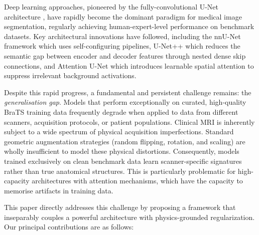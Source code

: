 \documentclass[conference]{IEEEtran}
\begin{document}
Deep learning approaches, pioneered by the fully-convolutional U-Net architecture \cite{ronneberger2015u}, have rapidly become the dominant paradigm for medical image segmentation, regularly achieving human-expert-level performance on benchmark datasets. Key architectural innovations have followed, including the nnU-Net framework \cite{isensee2021nnu} which uses self-configuring pipelines, U-Net++ \cite{zhou2018unet++} which reduces the semantic gap between encoder and decoder features through nested dense skip connections, and Attention U-Net \cite{oktay2018attention} which introduces learnable spatial attention to suppress irrelevant background activations.

Despite this rapid progress, a fundamental and persistent challenge remains: the \textit{generalisation gap}. Models that perform exceptionally on curated, high-quality BraTS training data frequently degrade when applied to data from different scanners, acquisition protocols, or patient populations. Clinical MRI is inherently subject to a wide spectrum of physical acquisition imperfections. Standard geometric augmentation strategies (random flipping, rotation, and scaling) are wholly insufficient to model these physical distortions. Consequently, models trained exclusively on clean benchmark data learn scanner-specific signatures rather than true anatomical structures. This is particularly problematic for high-capacity architectures with attention mechanisms, which have the capacity to memorise artifacts in training data.

This paper directly addresses this challenge by proposing a framework that inseparably couples a powerful architecture with physics-grounded regularization. Our principal contributions are as follows:
\end{document}
